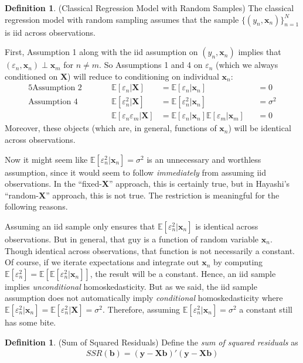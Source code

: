 \documentclass[12pt]{article}
\theoremstyle{plain}
\theoremstyle{definition}
\newtheorem{defn}[thm]{Definition}
\theoremstyle{remark}
\newcommand{\bsb}{\boldsymbol{b}}
\newcommand{\bsx}{\boldsymbol{x}}
\newcommand{\bsX}{\boldsymbol{X}}
\newcommand{\bsy}{\boldsymbol{y}}
\newcommand{\E}{\mathbb{E}}
\newcommand{\nN}{_{n=1}^N}
\begin{document}
\begin{defn}(Classical Regression Model with Random Samples)
The classical regression model with random sampling assumes that the
sample $\{(y_n,\bsx_n)\}\nN$ is iid across observations.

First, Assumption 1 along with the iid assumption on
$(y_n,\bsx_n)$ implies that $(\varepsilon_n, \bsx_n)\perp \bsx_m$ for
$n\neq m$.
So Assumptions 1 and 4 on $\varepsilon_n$ (which we always
conditioned on $\bsX$) will reduce to conditioning on individual
$\bsx_n$:
\begin{alignat*}{5}
  \text{Assumption 2} &&\qquad
   \E[\varepsilon_n | \bsX] &=
   \E[\varepsilon_n | \bsx_n] &&= 0\\
  \text{Assumption 4} &&\qquad
   \E[\varepsilon_n^2 | \bsX] &=
   \E[\varepsilon_n^2 | \bsx_n] &&= \sigma^2\\
  \text{} &&\qquad
   \E[\varepsilon_n\varepsilon_m|\bsX] &=
   \E[\varepsilon_n|\bsx_n] \E[\varepsilon_m|\bsx_m]
   &&=0
\end{alignat*}
Moreover, these objects (which are, in general, functions of $\bsx_n$)
will be identical across observations.

Now it might seem like $\E[\varepsilon_n^2|\bsx_n]=\sigma^2$ is an
unnecessary and worthless assumption, since it would seem to follow
\emph{immediately} from assuming iid observations. In the
``fixed-$\bsX$'' approach, this is certainly true, but in Hayashi's
``random-$\bsX$'' approach, this is not true. The restriction is
meaningful for the following reasons.

Assuming an iid sample only ensures that $\E[\varepsilon_n^2|\bsx_n]$ is
identical across observations. But in general, that guy is a function of
random variable $\bsx_n$. Though identical across observations, that
function is not necessarily a constant. Of course, if
we iterate expectations and integrate out $\bsx_n$ by computing
$\E[\varepsilon_n^2]=\E[\E[\varepsilon_n^2|\bsx_n]]$, the result will be
a constant. Hence, an iid sample implies \emph{unconditional}
homoskedasticity. But as we said, the iid sample assumption
does not automatically imply \emph{conditional} homoskedasticity where
$\E[\varepsilon_n^2 | \bsx_n]
=\E[\varepsilon_n^2 | \bsX] = \sigma^2$.
Therefore, assuming $\E[\varepsilon_n^2|\bsx_n]=\sigma^2$ a constant
still has some bite.
\end{defn}


\begin{defn}(Sum of Squared Residuals)
Define the \emph{sum of squared residuals} as
\begin{align*}
  SSR(\bsb) = (\bsy - \bsX \bsb)'(\bsy - \bsX \bsb)
\end{align*}
\end{defn}
\end{document}
